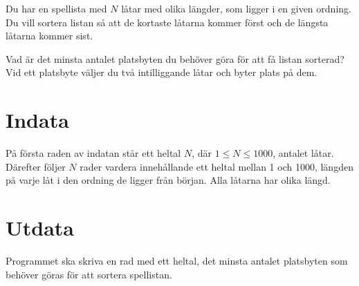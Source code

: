 
Du har en spellista med $N$ låtar med olika längder, som ligger i en given ordning. Du vill sortera listan så att de kortaste
låtarna kommer först och de längsta låtarna kommer sist.

Vad är det minsta antalet platsbyten du behöver göra för att få listan sorterad?
Vid ett platsbyte väljer du två intilliggande låtar och byter plats på
dem.

\section*{Indata}

På första raden av indatan står ett heltal $N$, där $1\le N \le
1000$, antalet låtar. Därefter följer $N$ rader vardera innehållande ett heltal mellan 1 och 1000,
längden på varje låt i den ordning de ligger från början. Alla låtarna
har olika längd.

\section*{Utdata}

Programmet ska skriva en rad med ett heltal, det minsta antalet
platsbyten som behöver göras för att sortera spellistan.

